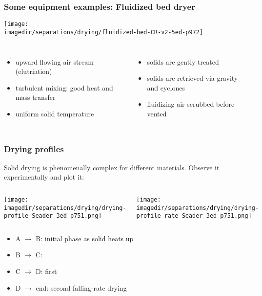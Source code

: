 \begin{frame}\frametitle{Some equipment examples: Fluidized bed dryer}

	\vspace{-18pt}
	\begin{center}
		\texttt{[image: \\imagedir/separations/drying/fluidized-bed-CR-v2-5ed-p972]}
	\end{center}
	\vspace{-28pt}
	\begin{columns}[t]
		\small
			\begin{itemize}
				\item	upward flowing air stream (elutriation)
				\item	turbulent mixing: good heat and mass transfer
				\item	uniform solid temperature
			\end{itemize}
			\begin{itemize}
				\item	solids are gently treated
				\item	solids are retrieved via gravity and cyclones
				\item	fluidizing air scrubbed before vented
			\end{itemize}
	\end{columns}
\end{frame}

\begin{frame}\frametitle{Drying profiles}
	Solid drying is phenomenally complex for different materials. Observe it experimentally and plot it:

	\hfill{}
	\vspace{-12pt}
	\begin{columns}[b]
			\begin{center}
				\texttt{[image: \\imagedir/separations/drying/drying-profile-Seader-3ed-p751.png]}
			\end{center}
			\begin{center}
				\texttt{[image: \\imagedir/separations/drying/drying-profile-rate-Seader-3ed-p751.png]}
			\end{center}
			\vspace{-7pt}
	\end{columns}

	\begin{itemize}
		\item	A $\rightarrow$ B: initial phase as solid heats up
		\item	B $\rightarrow$ C: {\color{purple}{constant-rate drying}}
		\item	C $\rightarrow$ D: first {\color{purple}{falling-rate drying}}
		\item	D $\rightarrow$ end: second falling-rate drying
	\end{itemize}
\end{frame}

